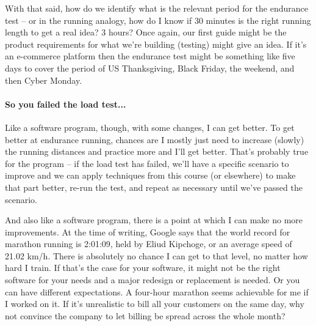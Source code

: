 With that said, how do we identify what is the relevant period for the endurance test -- or in the running analogy, how do I know if 30 minutes is the right running length to get a real idea? 3 hours? Once again, our first guide might be the product requirements for what we're building (testing) might give an idea. If it's an e-commerce platform then the endurance test might be something like five days to cover the period of US Thanksgiving, Black Friday, the weekend, and then Cyber Monday. 

\paragraph{So you failed the load test...}
Like a software program, though, with some changes, I can get better. To get better at endurance running, chances are I mostly just need to increase (slowly) the running distances and practice more and I'll get better. That's probably true for the program -- if the load test has failed, we'll have a specific scenario to improve and we can apply techniques from this course (or elsewhere) to make that part better, re-run the test, and repeat as necessary until we've passed the scenario.

And also like a software program, there is a point at which I can make no more improvements. At the time of writing, Google says that the world record for marathon running is 2:01:09, held by Eliud Kipchoge, or an average speed of 21.02 km/h. There is absolutely no chance I can get to that level, no matter how hard I train. If that's the case for your software, it might not be the right software for your needs and a major redesign or replacement is needed. Or you can have different expectations. A four-hour marathon seems achievable for me if I worked on it.  If it's unrealistic to bill all your customers on the same day, why not convince the company to let billing be spread across the whole month?






